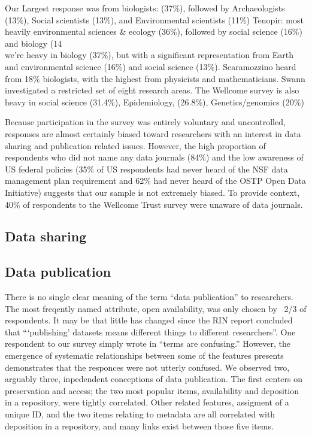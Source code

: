 \documentclass[10pt]{article}
\begin{document}
Our Largest response was from biologists: (37\%), followed by Archaeologists (13\%), Social scientists (13\%), and Environmental scientists (11\%)
Tenopir: most heavily environmental sciences & ecology (36\%), followed by social science (16\%) and biology (14\\%
we're heavy in biology (37\%), but with a significant representation from Earth and environmental science (16\%) and social science (13\%).
Scaramozzino heard from 18\% biologists, with the highest from physicists and mathematicians.
Swann investigated a restricted set of eight research areas.
The Wellcome survey is also heavy in social science (31.4\%), Epidemiology, (26.8\%), Genetics/genomics (20\%)

Because participation in the survey was entirely voluntary and uncontrolled, responses are almost certainly biased toward researchers with an interest in data sharing and publication related issues.
However, the high proportion of respondents who did not name any data journals (84\%) and the low awareness of US federal policies (35\% of US respondents had never heard of the NSF data management plan requirement and 62\% had never heard of the OSTP Open Data Initiative) suggests that our sample is not extremely biased.
To provide context, 40\% of respondents to the Wellcome Trust survey were unaware of data journals.

\subsection*{Data sharing}

\subsection*{Data publication}

There is no single clear meaning of the term ``data publication'' to researchers.
The most freqently named attribute, open availability, was only chosen by ~2/3 of respondents.
It may be that little has changed since the RIN report concluded that ```publishing' datasets means different things to different researchers''\cite{swan_share_2008}.
One respondent to our survey simply wrote in ``terms are confusing.''
However, the emergence of systematic relationships between some of the features presents demonstrates that the responces were not utterly confused.
We observed two, arguably three, inpedendent conceptions of data publication.
The first centers on preservation and access; the two most popular items, availability and deposition in a repository, were tightly correlated.
Other related features, assigment of a unique ID, and the two items relating to metadata are all correlated with deposition in a repository, and many links exist between those five items.
\end{document}
